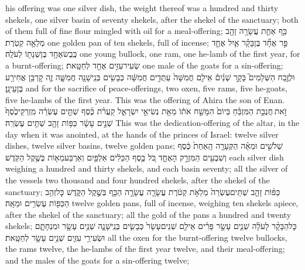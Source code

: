 \documentclass[11pt, openany]{book}
\begin{document}
{his offering was one silver dish, the weight thereof was a hundred and thirty shekels, one silver basin of seventy shekels, after the shekel of the sanctuary; both of them full of fine flour mingled with oil for a meal-offering;}
{כַּ֥ף אַחַ֛ת עֲשָׂרָ֥ה זָהָ֖ב מְלֵאָ֥ה קְטֹֽרֶת׃}
{one golden pan of ten shekels, full of incense;}
{פַּ֣ר אֶחָ֞ד בֶּן\maqqaf בָּקָ֗ר אַ֧יִל אֶחָ֛ד כֶּֽבֶשׂ\maqqaf אֶחָ֥ד בֶּן\maqqaf שְׁנָת֖וֹ לְעֹלָֽה׃}
{one young bullock, one ram, one he-lamb of the first year, for a burnt-offering;}
{שְׂעִיר\maqqaf עִזִּ֥ים אֶחָ֖ד לְחַטָּֽאת׃}
{one male of the goats for a sin-offering;}
{וּלְזֶ֣בַח הַשְּׁלָמִים֮ בָּקָ֣ר שְׁנַ֒יִם֒ אֵילִ֤ם חֲמִשָּׁה֙ עַתֻּדִ֣ים חֲמִשָּׁ֔ה כְּבָשִׂ֥ים בְּנֵֽי\maqqaf שָׁנָ֖ה חֲמִשָּׁ֑ה זֶ֛ה קׇרְבַּ֥ן אֲחִירַ֖ע בֶּן\maqqaf עֵינָֽן׃ \petucha }
{and for the sacrifice of peace-offerings, two oxen, five rams, five he-goats, five he-lambs of the first year. This was the offering of Ahira the son of Enan.}
{זֹ֣את \legarmeh  חֲנֻכַּ֣ת הַמִּזְבֵּ֗חַ בְּיוֹם֙ הִמָּשַׁ֣ח אֹת֔וֹ מֵאֵ֖ת נְשִׂיאֵ֣י יִשְׂרָאֵ֑ל קַעֲרֹ֨ת כֶּ֜סֶף שְׁתֵּ֣ים עֶשְׂרֵ֗ה מִֽזְרְקֵי\maqqaf כֶ֙סֶף֙ שְׁנֵ֣ים עָשָׂ֔ר כַּפּ֥וֹת זָהָ֖ב שְׁתֵּ֥ים עֶשְׂרֵֽה׃}
{This was the dedication-offering of the altar, in the day when it was anointed, at the hands of the princes of Israel: twelve silver dishes, twelve silver basins, twelve golden pans;}
{שְׁלֹשִׁ֣ים וּמֵאָ֗ה הַקְּעָרָ֤ה הָֽאַחַת֙ כֶּ֔סֶף וְשִׁבְעִ֖ים הַמִּזְרָ֣ק הָאֶחָ֑ד כֹּ֚ל כֶּ֣סֶף הַכֵּלִ֔ים אַלְפַּ֥יִם וְאַרְבַּע\maqqaf מֵא֖וֹת בְּשֶׁ֥קֶל הַקֹּֽדֶשׁ׃}
{each silver dish weighing a hundred and thirty shekels, and each basin seventy; all the silver of the vessels two thousand and four hundred shekels, after the shekel of the sanctuary;}
{כַּפּ֨וֹת זָהָ֤ב שְׁתֵּים\maqqaf עֶשְׂרֵה֙ מְלֵאֹ֣ת קְטֹ֔רֶת עֲשָׂרָ֧ה עֲשָׂרָ֛ה הַכַּ֖ף בְּשֶׁ֣קֶל הַקֹּ֑דֶשׁ כׇּל\maqqaf זְהַ֥ב הַכַּפּ֖וֹת עֶשְׂרִ֥ים וּמֵאָֽה׃}
{twelve golden pans, full of incense, weighing ten shekels apiece, after the shekel of the sanctuary; all the gold of the pans a hundred and twenty shekels;}
{כׇּל\maqqaf הַבָּקָ֨ר לָעֹלָ֜ה שְׁנֵ֧ים עָשָׂ֣ר פָּרִ֗ים אֵילִ֤ם שְׁנֵים\maqqaf עָשָׂר֙ כְּבָשִׂ֧ים בְּנֵֽי\maqqaf שָׁנָ֛ה שְׁנֵ֥ים עָשָׂ֖ר וּמִנְחָתָ֑ם וּשְׂעִירֵ֥י עִזִּ֛ים שְׁנֵ֥ים עָשָׂ֖ר לְחַטָּֽאת׃}
{all the oxen for the burnt-offering twelve bullocks, the rams twelve, the he-lambs of the first year twelve, and their meal-offering; and the males of the goats for a sin-offering twelve;}
\end{document}
